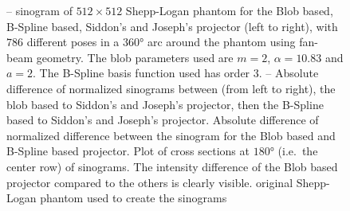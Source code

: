\begin{figure}
	\caption{-- sinogram of \(512 \times
		512\) Shepp-Logan phantom for the Blob based, B-Spline based, Siddon's and Joseph's
		projector (left to right), with \(786\) different poses in a \(360\)° arc around the
		phantom using fan-beam geometry. The blob parameters used are \(m=2\),
		\(\alpha=10.83\) and \(a=2\). The B-Spline basis function used has order \(3\).%
		-- Absolute
		difference of normalized sinograms between (from left to right), the blob based to
		Siddon's and Joseph's projector, then the B-Spline based to Siddon's and Joseph's
		projector.  Absolute difference of normalized
		difference between the sinogram for the Blob based and B-Spline based projector.%
		 Plot of cross sections at \(180\)° (i.e.\ the
		center row) of sinograms. The intensity difference of the Blob based projector
		compared to the others is clearly visible. 
		original Shepp-Logan phantom used to create the sinograms}%
	\label{fig:sinogram_shepp_logan}
\end{figure}

